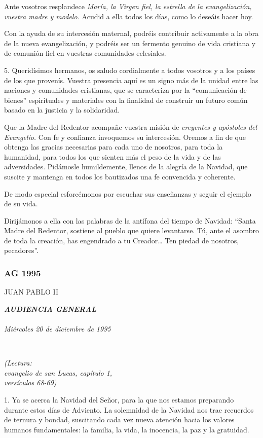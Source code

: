 Ante vosotros resplandece \emph{María, la Virgen fiel, la estrella de la
	evangelización, vuestra madre y modelo.} Acudid a ella todos los días,
como lo deseáis hacer hoy.

Con la ayuda de su intercesión maternal, podréis contribuir activamente
a la obra de la nueva evangelización, y podréis ser un fermento genuino
de vida cristiana y de comunión fiel en vuestras comunidades eclesiales.

5. Queridísimos hermanos, os saludo cordialmente a todos vosotros y a
los países de los que provenís. Vuestra presencia aquí es un signo más
de la unidad entre las naciones y comunidades cristianas, que se
caracteriza por la ``comunicación de bienes'' espirituales y materiales
con la finalidad de construir un futuro común basado en la justicia y la
solidaridad.

Que la Madre del Redentor acompañe vuestra misión de \emph{creyentes y
	apóstoles del Evangelio.} Con fe y confianza invoquemos su intercesión.
Oremos a fin de que obtenga las gracias necesarias para cada uno de
nosotros, para toda la humanidad, para todos los que sienten más el peso
de la vida y de las adversidades. Pidámosle humildemente, llenos de la
alegría de la Navidad, que suscite y mantenga en todos los bautizados
una fe convencida y coherente.

De modo especial esforcémonos por escuchar sus enseñanzas y seguir el
ejemplo de su vida.

Dirijámonos a ella con las palabras de la antífona del tiempo de
Navidad: ``Santa Madre del Redentor, sostiene al pueblo que quiere
levantarse. Tú, ante el asombro de toda la creación, has engendrado a tu
Creador\ldots{} Ten piedad de nosotros, pecadores''.

\subsubsection{AG 1995}
JUAN PABLO II

\textbf{\emph{AUDIENCIA GENERAL\\
}}\\
\emph{Miércoles 20 de diciembre de 1995}

~

\emph{(Lectura:\\
	evangelio de san Lucas, capítulo 1,\\
	versículos 68-69)}

1. Ya se acerca la Navidad del Señor, para la que nos estamos preparando
durante estos días de Adviento. La solemnidad de la Navidad nos trae
recuerdos de ternura y bondad, suscitando cada vez nueva atención hacia
los valores humanos fundamentales: la familia, la vida, la inocencia, la
paz y la gratuidad.

